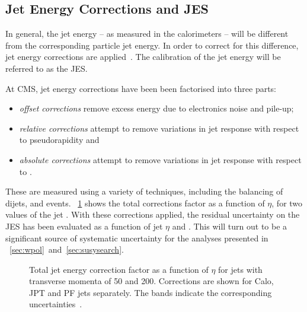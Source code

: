 \subsection{Jet Energy Corrections and \acl{JES}}
In general, the jet energy -- as measured in the calorimeters -- will be
different from the corresponding particle jet energy. In order to correct for
this difference, jet energy corrections are
applied~\cite{jet_energy_cms,jet_energy_pas}. The calibration of the jet energy
will be referred to as the \acf{JES}.

At \ac{CMS}, jet energy corrections have been been factorised into three parts:
\begin{itemize}
\item \emph{offset corrections} remove excess energy due to electronics noise
  and pile-up;
\item \emph{relative corrections} attempt to remove variations in jet response
  with respect to pseudorapidity and
\item \emph{absolute corrections} attempt to remove variations in jet response
  with respect to \Pt.
\end{itemize}

These are measured using a variety of techniques, including the balancing of
dijets, \gammajets and \Zjets events. \fig~\ref{fig:reco_jet_energy_corr} shows
the total corrections factor as a function of $\eta$, for two values of the jet
\Pt. With these corrections applied, the residual uncertainty on the \ac{JES}
has been evaluated as a function of jet $\eta$ and \Pt. This will turn out to be
a significant source of systematic uncertainty for the analyses presented in
\chaps~\ref{sec:wpol}~and~\ref{sec:susysearch}.

\begin{figure}[h!]
  \centering
  \quad
  \quad
  \caption[Total jet energy correction factor as a function of $\eta$]{Total jet
    energy correction factor as a function of $\eta$ for jets with transverse
    momenta of  \unit{50}{\GeV} and
     \unit{200}{\GeV}. Corrections are shown for
    \ac{Calo}, \ac{JPT} and \ac{PF} jets separately. The bands indicate the
    corresponding uncertainties~\cite{jet_energy_pas}.}
  \label{fig:reco_jet_energy_corr}
\end{figure}

